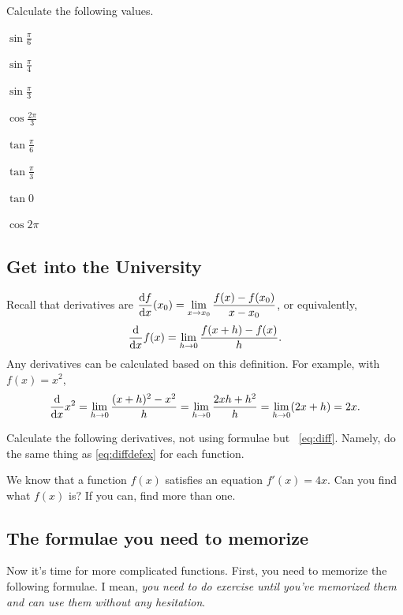 \documentclass[11pt,pdfa,lastpage]{MishoNote}
\begin{document}
\begin{problems}
  \Problem[S] Calculate the following values.
  \begin{menumerate}{4}
    \item $\displaystyle\sin\frac\pi6$
    \item $\displaystyle\sin\frac\pi4$
    \item $\displaystyle\sin\frac\pi3$
    \item $\displaystyle\cos\frac{2\pi}3$
    \item $\displaystyle\tan\frac\pi6$
    \item $\displaystyle\tan\frac{\pi}3$
    \item $\tan0$
    \item $\cos2\pi$
  \end{menumerate}
\end{problems}
\subsection{Get into the University}
Recall that derivatives are 
$\displaystyle\diff{f}{x}(x_0)=\lim_{x\to x_0}\frac{f(x)-f(x_0)}{x-x_0}$, or equivalently,
\begin{equation}
\diff{}{x}f(x)=\lim_{h\to 0}\frac{f(x+h)-f(x)}{h}.\label{eq:diff}
\end{equation}
Any derivatives can be calculated based on this definition. For example, with $f(x)=x^2$,
\begin{equation}
  \diff{}{x}x^2=\lim_{h\to 0}\frac{(x+h)^2-x^2}{h}=\lim_{h\to 0}\frac{2xh+h^2}{h}=\lim_{h\to 0}(2x+h)=2x.
  \label{eq:diffdefex}
\end{equation}


\begin{problems}
\Problem[S]\relax
  Calculate the following derivatives, not using formulae but ~\eqref{eq:diff}. Namely, do the same thing as \eqref{eq:diffdefex} for each function.
  \begin{menumerate}{4}
  \end{menumerate}
 \Problem[S] We know that a function $f(x)$ satisfies an equation $f'(x)=4x$. Can you find what $f(x)$ is? If you can, find more than one.
\end{problems}

\subsection{The formulae you need to memorize}
Now it's time for more complicated functions. First, you need to memorize the following formulae.
I mean, \emph{you need to do exercise until you've memorized them and can use them without any hesitation}.
\end{document}
